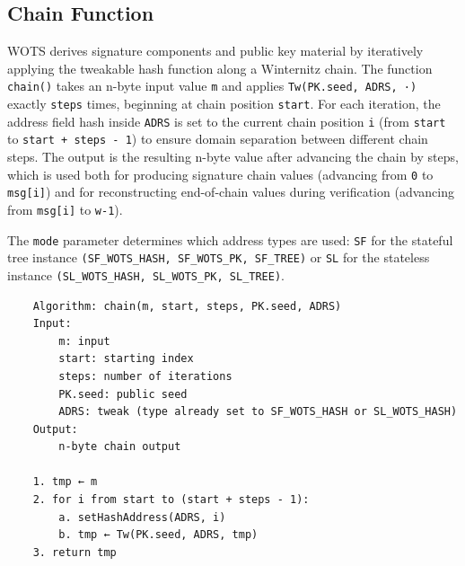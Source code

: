 \subsection{Chain Function}
WOTS derives signature components and public key material by iteratively applying the tweakable hash function along a Winternitz chain. The function \texttt{chain()} takes an n-byte input value \texttt{m} and applies \texttt{Tw(PK.seed, ADRS, ·)} exactly \texttt{steps} times, beginning at chain position \texttt{start}. For each iteration, the address field hash inside \texttt{ADRS} is set to the current chain position \texttt{i} (from \texttt{start} to \texttt{start + steps - 1}) to ensure domain separation between different chain steps. The output is the resulting n-byte value after advancing the chain by steps, which is used both for producing signature chain values (advancing from \texttt{0} to \texttt{msg[i]}) and for reconstructing end-of-chain values during verification (advancing from \texttt{msg[i]} to \texttt{w-1}).

The \texttt{mode} parameter determines which address types are used: \texttt{SF} for the stateful tree instance \texttt{(SF\_WOTS\_HASH, SF\_WOTS\_PK, SF\_TREE)} or \texttt{SL} for the stateless instance \texttt{(SL\_WOTS\_HASH, SL\_WOTS\_PK, SL\_TREE)}.
\begin{verbatim}
    Algorithm: chain(m, start, steps, PK.seed, ADRS)
    Input:
        m: input
        start: starting index
        steps: number of iterations
        PK.seed: public seed
        ADRS: tweak (type already set to SF_WOTS_HASH or SL_WOTS_HASH)
    Output:
        n-byte chain output

    1. tmp ← m
    2. for i from start to (start + steps - 1):
        a. setHashAddress(ADRS, i)
        b. tmp ← Tw(PK.seed, ADRS, tmp)
    3. return tmp
\end{verbatim}

